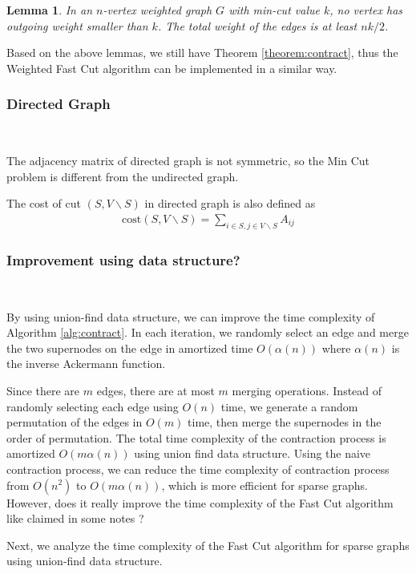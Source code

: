 \documentclass[11pt]{article}
\theoremstyle{plain}
\newtheorem{lemma}{Lemma}[section]
\begin{document}
\begin{lemma}
    In an $n$-vertex weighted graph $G$ with min-cut value $k$, no vertex has outgoing weight smaller than $k$. The total weight of the edges is at least $nk/2$.
\end{lemma}

Based on the above lemmas, we still have Theorem \ref{theorem:contract}, thus the Weighted Fast Cut algorithm can be implemented in a similar way.

\subsubsection{Directed Graph}\

The adjacency matrix of directed graph is not symmetric, so the Min Cut problem is different from the undirected graph.

The cost of cut $(S,V\backslash S)$ in directed graph is also defined as
\begin{align*}
    \text{cost}(S,V\backslash S)=\sum_{i\in S, j\in V\backslash S}A_{ij}
\end{align*}

\subsubsection{Improvement using data structure?}\

By using union-find data structure, we can improve the time complexity of Algorithm \ref{alg:contract}. In each iteration, we randomly select an edge and merge the two supernodes on the edge in amortized time $O(\alpha(n))$ where $\alpha(n)$ is the inverse Ackermann function. 

Since there are $m$ edges,  there are at most $m$ merging operations. Instead of randomly selecting each edge using $O(n)$ time, we generate a random permutation of the edges in $O(m)$ time, then merge the supernodes in the order of permutation. The total time complexity of the contraction process is amortized $O(m\alpha(n))$ using union find data structure. Using the naive contraction process, we can reduce the time complexity of contraction process from $O(n^2)$ to $O(m\alpha(n))$, which is more efficient for sparse graphs. However, does it really improve the time complexity of the Fast Cut algorithm like claimed in some notes\cite{CS161Lecture16} ?

Next, we analyze the time complexity of the Fast Cut algorithm for sparse graphs using union-find data structure.
\end{document}
